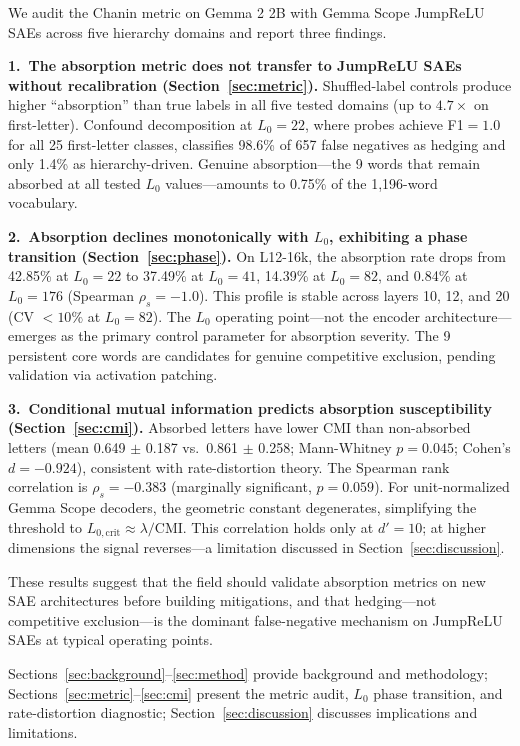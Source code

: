 \documentclass{article}
\begin{document}
We audit the Chanin metric on Gemma 2 2B with Gemma Scope JumpReLU SAEs across five hierarchy domains and report three findings.

\textbf{1.\ The absorption metric does not transfer to JumpReLU SAEs without recalibration (Section~\ref{sec:metric}).} Shuffled-label controls produce higher ``absorption'' than true labels in all five tested domains (up to $4.7\times$ on first-letter). Confound decomposition at $L_0{=}22$, where probes achieve F1${=}1.0$ for all 25 first-letter classes, classifies 98.6\% of 657 false negatives as hedging and only 1.4\% as hierarchy-driven. Genuine absorption---the 9 words that remain absorbed at all tested $L_0$ values---amounts to 0.75\% of the 1,196-word vocabulary.

\textbf{2.\ Absorption declines monotonically with $L_0$, exhibiting a phase transition (Section~\ref{sec:phase}).} On L12-16k, the absorption rate drops from 42.85\% at $L_0{=}22$ to 37.49\% at $L_0{=}41$, 14.39\% at $L_0{=}82$, and 0.84\% at $L_0{=}176$ (Spearman $\rho_s = -1.0$). This profile is stable across layers 10, 12, and 20 (CV $< 10\%$ at $L_0{=}82$). The $L_0$ operating point---not the encoder architecture---emerges as the primary control parameter for absorption severity. The 9 persistent core words are candidates for genuine competitive exclusion, pending validation via activation patching.

\textbf{3.\ Conditional mutual information predicts absorption susceptibility (Section~\ref{sec:cmi}).} Absorbed letters have lower CMI than non-absorbed letters (mean 0.649 $\pm$ 0.187 vs.\ 0.861 $\pm$ 0.258; Mann-Whitney $p = 0.045$; Cohen's $d = -0.924$), consistent with rate-distortion theory. The Spearman rank correlation is $\rho_s = -0.383$ (marginally significant, $p = 0.059$). For unit-normalized Gemma Scope decoders, the geometric constant degenerates, simplifying the threshold to $L_{0,\text{crit}} \approx \lambda / \text{CMI}$. This correlation holds only at $d'{=}10$; at higher dimensions the signal reverses---a limitation discussed in Section~\ref{sec:discussion}.

These results suggest that the field should validate absorption metrics on new SAE architectures before building mitigations, and that hedging---not competitive exclusion---is the dominant false-negative mechanism on JumpReLU SAEs at typical operating points.

Sections~\ref{sec:background}--\ref{sec:method} provide background and methodology; Sections~\ref{sec:metric}--\ref{sec:cmi} present the metric audit, $L_0$ phase transition, and rate-distortion diagnostic; Section~\ref{sec:discussion} discusses implications and limitations.
\end{document}
